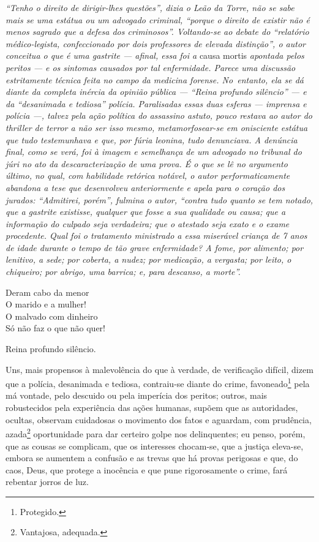 \begin{resumo}
\emph{``Tenho o direito de dirigir-lhes questões'', dizia o Leão da
Torre, não se sabe mais se uma estátua ou um advogado criminal,
``porque o direito de existir não é menos sagrado que a defesa dos
criminosos''. Voltando-se ao debate do ``relatório médico-legista,
confeccionado por dois professores de elevada distinção'', o autor
conceitua o que é uma gastrite --- afinal, essa foi a} causa mortis
\emph{apontada pelos peritos --- e os sintomas causados por tal
enfermidade. Parece uma discussão estritamente técnica feita no campo da
medicina forense. No~entanto, ela se dá diante da completa inércia da
opinião pública --- ``Reina profundo silêncio'' --- e da ``desanimada
e tediosa'' polícia. Paralisadas essas duas esferas --- imprensa e polícia
---, talvez pela ação política do assassino astuto, pouco restava ao
autor do thriller de terror a não ser isso mesmo, metamorfosear-se em
onisciente estátua que tudo testemunhava e que, por fúria leonina, tudo
denunciava. A denúncia final, como se verá, foi à imagem e semelhança de
um advogado no tribunal do júri no ato da descaracterização de uma
prova. É o que se lê no argumento último, no qual, com habilidade
retórica notável, o autor performaticamente abandona a tese que
desenvolveu anteriormente e apela para o coração dos jurados:
``Admitirei, porém'', fulmina o autor, ``contra tudo quanto se tem notado,
que a gastrite existisse, qualquer que fosse a sua qualidade ou causa;
que a informação do culpado seja verdadeira; que o atestado seja exato e
o exame procedente. Qual foi o tratamento ministrado a essa miserável
criança de 7 anos de idade durante o tempo de tão grave enfermidade? A
fome, por alimento; por lenitivo, a sede; por coberta, a nudez; por
medicação, a vergasta; por leito, o chiqueiro; por abrigo, uma barrica;
e, para descanso, a morte''. }
\end{resumo}\pagebreak

\epigraph{Deram cabo da menor\\
O marido e a mulher!\\
O malvado com dinheiro\\
Só não faz o que não quer!}{}

\noindent{}Reina profundo silêncio.

Uns, mais propensos à malevolência do que à verdade, de verificação
difícil, dizem que a polícia, desanimada e tediosa, contraiu-se diante
do crime, favoneado\footnote{Protegido.} pela má vontade, pelo
descuido ou pela imperícia dos peritos; outros, mais robustecidos pela
experiência das ações humanas, supõem que as autoridades, ocultas,
observam cuidadosas o movimento dos fatos e aguardam, com prudência,
azada\footnote{Vantajosa, adequada.} oportunidade para dar certeiro
golpe nos delinquentes; eu penso, porém, que as cousas se complicam, que
os interesses chocam-se, que a justiça eleva-se, embora se aumentem a
confusão e as trevas que há provas perigosas e que, do caos, Deus, que
protege a inocência e que pune rigorosamente o crime, fará rebentar
jorros de luz.


